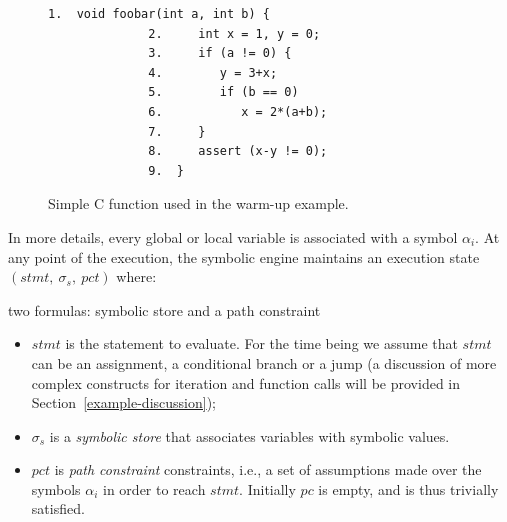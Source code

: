 
\begin{figure}[t]
\begin{lstlisting}[basicstyle=\ttfamily\small]
              1.  void foobar(int a, int b) {
              2.     int x = 1, y = 0;
              3.     if (a != 0) {
              4.        y = 3+x;
              5.        if (b == 0)
              6.           x = 2*(a+b);
              7.     }
              8.     assert (x-y != 0);
              9.  }
\end{lstlisting}
\caption{Simple C function used in the warm-up example.}
\label{fig:example-1}
\end{figure}

In more details, every global or local variable is associated with a symbol $\alpha_i$.  At any point of the execution, the symbolic engine maintains an execution state $(stmt,~\sigma_s,~pct)$ where:

two formulas:
symbolic store and a path constraint

\begin{itemize}

  \item $stmt$ is the statement to evaluate. For the time being we assume that $stmt$ can be an assignment, a conditional branch or a jump (a discussion of more complex constructs for iteration and function calls will be provided in Section~\ref{example-discussion});

\item $\sigma_s$ is a {\em symbolic store} that associates variables with symbolic values. 

  \item $pct$ is {\em path constraint}  constraints, i.e., a set of assumptions made over the symbols $\alpha_i$ in order to reach $stmt$. Initially $pc$ is empty, and is thus trivially satisfied.

\end{itemize}

